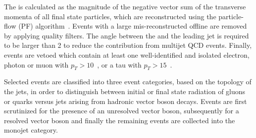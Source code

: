 The \ETm is calculated as the magnitude of the negative 
vector sum of the transverse momenta of all final state particles, which are reconstructed 
using the particle-flow (PF) algorithm~\cite{CMS-PAS-PFT-09-001}.
Events with a large mis-reconstructed offline \ETm are removed by applying quality filters. 
The angle between the \ETm and the leading jet is required to be larger than 2 to reduce the contribution from multijet QCD events. 
Finally, events are vetoed which contain at least one well-identified and isolated electron, photon or muon with $p_T>10$~\gev, or a tau with $p_T>15$~\gev.

Selected events are classified into three event categories, based on the topology of the jets, in order to distinguish between 
initial or final state radiation of gluons or quarks versus jets arising from hadronic vector boson decays.
Events are first scrutinized for the presence of an unresolved vector boson, subsequently for a resolved vector boson 
and finally the remaining events are collected into the monojet category.

